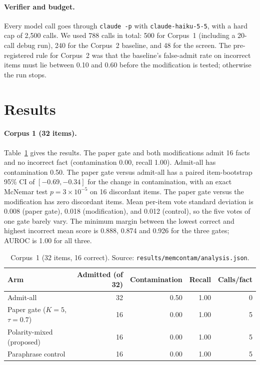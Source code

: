 \documentclass[11pt]{article}
\begin{document}
\paragraph{Verifier and budget.} Every model call goes through \texttt{claude -p} with \texttt{claude-haiku-5-5}, with a hard cap of 2,500 calls. We used 788 calls in total: 500 for Corpus~1 (including a 20-call debug run), 240 for the Corpus~2 baseline, and 48 for the screen. The pre-registered rule for Corpus~2 was that the baseline's false-admit rate on incorrect items must lie between 0.10 and 0.60 before the modification is tested; otherwise the run stops.

\section{Results}
\paragraph{Corpus 1 (32 items).} Table~\ref{tab:c1} gives the results. The paper gate and both modifications admit 16 facts and no incorrect fact (contamination 0.00, recall 1.00). Admit-all has contamination 0.50. The paper gate versus admit-all has a paired item-bootstrap 95\% CI of $[-0.69,-0.34]$ for the change in contamination, with an exact McNemar test $p=3\times10^{-5}$ on 16 discordant items. The paper gate versus the modification has zero discordant items. Mean per-item vote standard deviation is 0.008 (paper gate), 0.018 (modification), and 0.012 (control), so the five votes of one gate barely vary. The minimum margin between the lowest correct and highest incorrect mean score is 0.888, 0.874 and 0.926 for the three gates; AUROC is 1.00 for all three.

\begin{table}[h]
\centering
\begin{tabular}{lrrrr}
\toprule
Arm & Admitted (of 32) & Contamination & Recall & Calls/fact\\
\midrule
Admit-all & 32 & 0.50 & 1.00 & 0\\
Paper gate ($K{=}5$, $\tau{=}0.7$) & 16 & 0.00 & 1.00 & 5\\
Polarity-mixed (proposed) & 16 & 0.00 & 1.00 & 5\\
Paraphrase control & 16 & 0.00 & 1.00 & 5\\
\bottomrule
\end{tabular}
\caption{Corpus~1 (32 items, 16 correct). Source: \texttt{results/memcontam/analysis.json}.}
\label{tab:c1}
\end{table}
\end{document}
